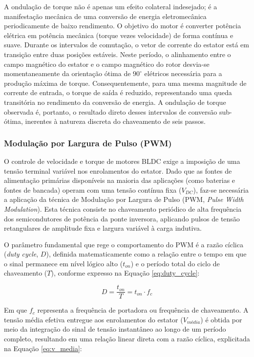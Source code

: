 A ondulação de torque não é apenas um efeito colateral indesejado; é a manifestação mecânica de uma conversão de energia eletromecânica periodicamente de baixo rendimento. O objetivo do motor é converter potência elétrica em potência mecânica (torque vezes velocidade) de forma contínua e suave. Durante os intervalos de comutação, o vetor de corrente do estator está em transição entre duas posições estáveis. Neste período, o alinhamento entre o campo magnético do estator e o campo magnético do rotor desvia-se momentaneamente da orientação ótima de $90^{\circ}$ elétricos necessária para a produção máxima de torque. Consequentemente, para uma mesma magnitude de corrente de entrada, o torque de saída é reduzido, representando uma queda transitória no rendimento da conversão de energia. A ondulação de torque observada é, portanto, o resultado direto desses intervalos de conversão sub-ótima, inerentes à natureza discreta do chaveamento de seis passos.

\subsubsection{Modulação por Largura de Pulso (PWM)} 

O controle de velocidade e torque de motores BLDC exige a imposição de uma tensão terminal variável nos enrolamentos do estator. Dado que as fontes de alimentação primárias disponíveis na maioria das aplicações (como baterias e fontes de bancada) operam com uma tensão contínua fixa ($V_{DC}$), faz-se necessária a aplicação da técnica de Modulação por Largura de Pulso (PWM, \textit{Pulse Width Modulation}). Esta técnica consiste no chaveamento periódico de alta frequência dos semicondutores de potência da ponte inversora, aplicando pulsos de tensão retangulares de amplitude fixa e largura variável à carga indutiva.

O parâmetro fundamental que rege o comportamento do PWM é a razão cíclica (\textit{duty cycle}, $D$), definida matematicamente como a relação entre o tempo em que o sinal permanece em nível lógico alto ($t_{on}$) e o período total do ciclo de chaveamento ($T$), conforme expresso na Equação \ref{eq:duty_cycle}:

\begin{equation}
D = \frac{t_{on}}{T} = t_{on} \cdot f_c
\label{eq:duty_cycle}
\end{equation}

Em que $f_c$ representa a frequência de portadora ou frequência de chaveamento. A tensão média efetiva entregue aos enrolamentos do estator ($V_{m\text{é}dia}$) é obtida por meio da integração do sinal de tensão instantâneo ao longo de um período completo, resultando em uma relação linear direta com a razão cíclica, explicitada na Equação \ref{eq:v_media}:

